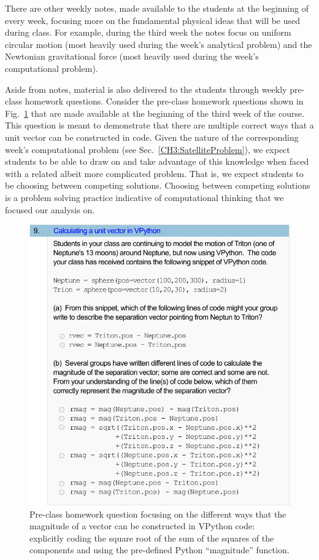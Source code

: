 \documentclass{msuphddissertation}
\begin{document}
\begin{doublespace}
There are other weekly notes, made available to the students at the beginning of every week, focusing more on the fundamental physical ideas that will be used during class.  For example, during the third week the notes focus on uniform circular motion (most heavily used during the week's analytical problem) and the Newtonian gravitational force (most heavily used during the week's computational problem).

Aside from notes, material is also delivered to the students through weekly pre-class homework questions.  Consider the pre-class homework questions shown in Fig.~\ref{CH3:PreClassQuestion} that are made available at the beginning of the third week of the course.  This question is meant to demonstrate that there are multiple correct ways that a unit vector can be constructed in code.  Given the nature of the corresponding week's computational problem (see Sec.~\ref{CH3:SatelliteProblem}), we expect students to be able to draw on and take advantage of this knowledge when faced with a related albeit more complicated problem.  That is, we expect students to be choosing between competing solutions.  Choosing between competing solutions is a problem solving practice indicative of computational thinking that we focused our analysis on.

\begin{figure}[ht]\centering
\includegraphics[scale=0.75]{images/CH3PreClassQuestion.pdf}
\caption{Pre-class homework question focusing on the different ways that the magnitude of a vector can be constructed in VPython code: explicitly coding the square root of the sum of the squares of the components and using the pre-defined Python ``magnitude'' function.}\label{CH3:PreClassQuestion}
\end{figure} 


\end{doublespace}
\end{document}
